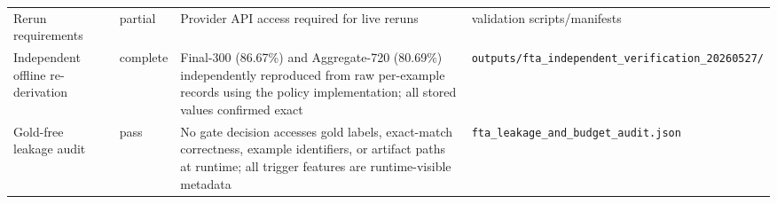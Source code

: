 \begin{table}[H]
{\begin{tabular}{p{}p{}p{}p{}}
Rerun requirements & partial & Provider API access required for live reruns & validation scripts/manifests \\
Independent offline re-derivation & complete & Final-300 (86.67\%) and Aggregate-720 (80.69\%) independently reproduced from raw per-example records using the policy implementation; all stored values confirmed exact & \texttt{outputs/fta\allowbreak\_independent\allowbreak\_verification\allowbreak\_20260527/} \\
Gold-free leakage audit & pass & No gate decision accesses gold labels, exact-match correctness, example identifiers, or artifact paths at runtime; all trigger features are runtime-visible metadata & \texttt{fta\allowbreak\_leakage\allowbreak\_and\allowbreak\_budget\allowbreak\_audit.json} \\
\bottomrule
\end{tabular}}
\end{table}
